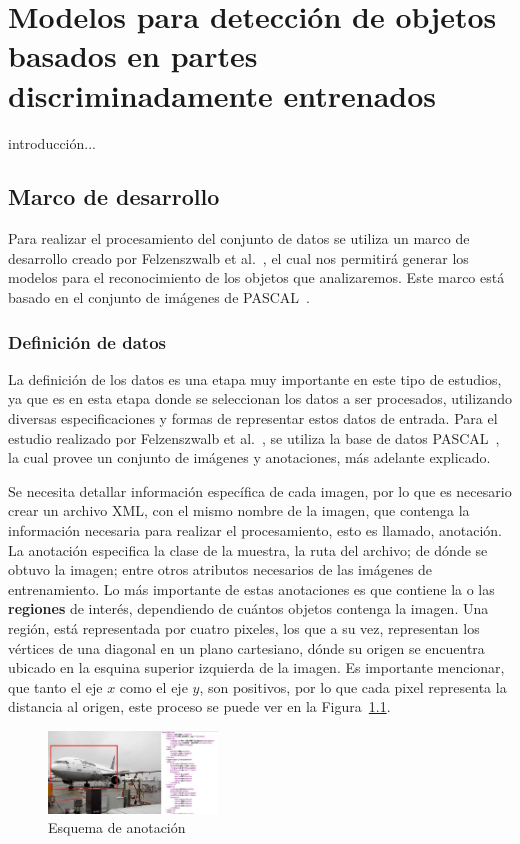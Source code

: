 \chapter[Modelos basados en partes ]{Modelos para detección de objetos basados en partes discriminadamente entrenados }\label{ch:framework}
introducción...

\section{Marco de desarrollo}
Para realizar el procesamiento del conjunto de datos se utiliza un marco de desarrollo creado por Felzenszwalb et al.~\cite{Felzenszwalb2010}, el cual nos permitirá generar los modelos para el reconocimiento de los objetos que analizaremos. Este marco está basado en el conjunto de imágenes de PASCAL~\cite{Everingham2010}.

\subsection{Definición de datos}
La definición de los datos es una etapa muy importante en este tipo de estudios, ya que es en esta etapa donde se seleccionan los datos a ser procesados, utilizando diversas especificaciones y formas de representar estos datos de entrada. Para el estudio realizado por Felzenszwalb et al.~\cite{Felzenszwalb2010}, se utiliza la base de datos PASCAL~\cite{Everingham2010}, la cual provee un conjunto de imágenes y anotaciones, más adelante explicado.

Se necesita detallar información específica de cada imagen, por lo que es necesario crear un archivo XML, con el mismo nombre de la imagen, que contenga la información necesaria para realizar el procesamiento, esto es llamado, anotación. La anotación especifica la clase de la muestra, la ruta del archivo; de dónde se obtuvo la imagen; entre otros atributos necesarios de las imágenes de entrenamiento. Lo más importante de estas anotaciones es que contiene la o las \textbf{regiones} de interés, dependiendo de cuántos objetos contenga la imagen. Una región, está representada por cuatro pixeles, los que a su vez, representan los vértices de una diagonal en un plano cartesiano, dónde su origen se encuentra ubicado en la esquina superior izquierda de la imagen. Es importante mencionar, que tanto el eje $x$ como el eje $y$, son positivos, por lo que cada pixel representa la distancia al origen, este proceso se puede ver en la Figura~\ref{fig:anota}.

\begin{figure}[tb]
  \centering
   \includegraphics[width=0.4\textwidth]{Figuras/plain-1.jpg}
   \caption{Esquema de anotación}
   \label{fig:anota}
\end{figure}

